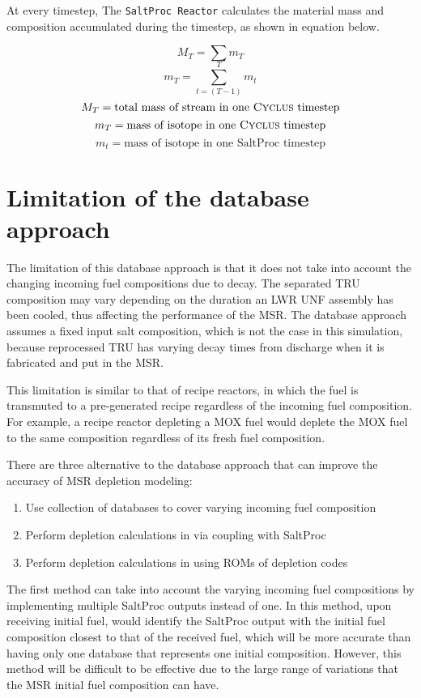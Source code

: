 At every timestep, 
The \texttt{SaltProc Reactor} calculates the material mass
and composition accumulated during the \Cyclus timestep,
as shown in equation below.

\[
M_{T} = \sum m_T
\]
\[
m_{T} = \sum_{t=(T-1)}^{T} m_{t}
\]
\[
M_T = \text{total mass of stream in one \Cyclus timestep}
\]
\[
m_T = \text{mass of isotope in one \Cyclus timestep}
\]
\[
m_t = \text{mass of isotope in one SaltProc timestep}
\]


\section{Limitation of the database approach}
\label{sec:limit}
The limitation of this database approach is that it does not
take into account the changing incoming fuel compositions due to decay.
The separated \gls{TRU} composition may vary depending on the duration
an \gls{LWR} \gls{UNF} assembly has been cooled, thus affecting the performance
of the \gls{MSR}. The database approach assumes a fixed input salt
composition, which is not the case in this simulation, because reprocessed
\gls{TRU} has varying decay times from discharge when it is fabricated and
put in the \gls{MSR}.

This limitation is similar to that of recipe reactors, in which the
fuel is transmuted to a pre-generated recipe regardless of the
incoming fuel composition. For example, a recipe reactor
depleting a \gls{MOX} fuel would deplete the \gls{MOX} fuel
to the same composition regardless of its fresh fuel composition.

There are three alternative to the database approach that can
improve the accuracy of \gls{MSR} depletion modeling:
\begin{enumerate}
    \item Use collection of databases to cover varying incoming fuel composition
    \item Perform depletion calculations in \Cyclus via coupling with SaltProc
    \item Perform depletion calculations in \Cyclus using \glspl{ROM} of depletion codes
\end{enumerate}

The first method can take into
account the varying incoming fuel compositions by implementing
multiple SaltProc outputs instead of one. In this method,
upon receiving initial fuel, \Cyclus would identify the SaltProc output with 
the initial fuel composition closest to that of the received fuel,
which will be more accurate than having only one database that 
represents one initial composition.
However, this method will be difficult
to be effective due to the large range of variations that the \gls{MSR}
initial fuel composition can have.


